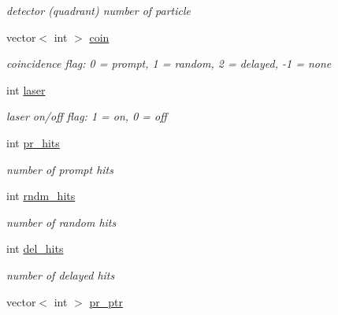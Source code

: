 \begin{DoxyCompactItemize}
\begin{DoxyCompactList}\small\item\em detector (quadrant) number of particle \end{DoxyCompactList}\item 
\hypertarget{classg__clx_a8bab7b24f203a20b19f1cbb565d176ad}{vector$<$ int $>$ \hyperlink{classg__clx_a8bab7b24f203a20b19f1cbb565d176ad}{coin}}\label{classg__clx_a8bab7b24f203a20b19f1cbb565d176ad}

\begin{DoxyCompactList}\small\item\em coincidence flag\-: 0 = prompt, 1 = random, 2 = delayed, -\/1 = none \end{DoxyCompactList}\item 
\hypertarget{classg__clx_a636dfc5c0302782a3a021dff3f6ec53e}{int \hyperlink{classg__clx_a636dfc5c0302782a3a021dff3f6ec53e}{laser}}\label{classg__clx_a636dfc5c0302782a3a021dff3f6ec53e}

\begin{DoxyCompactList}\small\item\em laser on/off flag\-: 1 = on, 0 = off \end{DoxyCompactList}\item 
\hypertarget{classg__clx_ab238ce0805d4af78ff43b999360a28f4}{int \hyperlink{classg__clx_ab238ce0805d4af78ff43b999360a28f4}{pr\-\_\-hits}}\label{classg__clx_ab238ce0805d4af78ff43b999360a28f4}

\begin{DoxyCompactList}\small\item\em number of prompt hits \end{DoxyCompactList}\item 
\hypertarget{classg__clx_a2ca61cc109e9e0580f35a4baa5ca4b21}{int \hyperlink{classg__clx_a2ca61cc109e9e0580f35a4baa5ca4b21}{rndm\-\_\-hits}}\label{classg__clx_a2ca61cc109e9e0580f35a4baa5ca4b21}

\begin{DoxyCompactList}\small\item\em number of random hits \end{DoxyCompactList}\item 
\hypertarget{classg__clx_a1205d577537a7131563e281be99f4a97}{int \hyperlink{classg__clx_a1205d577537a7131563e281be99f4a97}{del\-\_\-hits}}\label{classg__clx_a1205d577537a7131563e281be99f4a97}

\begin{DoxyCompactList}\small\item\em number of delayed hits \end{DoxyCompactList}\item 
\hypertarget{classg__clx_a33325f12a127d94cc10a8cc491df2f15}{vector$<$ int $>$ \hyperlink{classg__clx_a33325f12a127d94cc10a8cc491df2f15}{pr\-\_\-ptr}}\label{classg__clx_a33325f12a127d94cc10a8cc491df2f15}


\end{DoxyCompactItemize}
